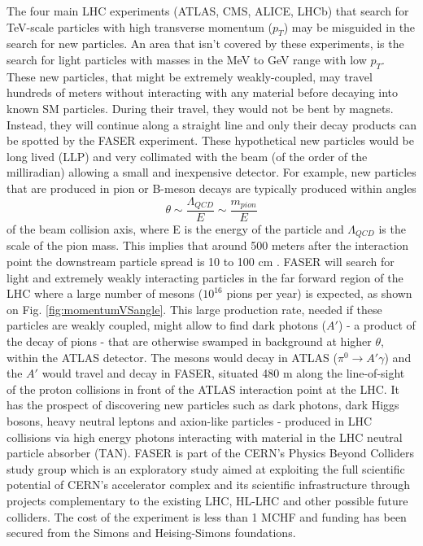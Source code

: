 The four main LHC experiments (ATLAS, CMS, ALICE, LHCb) that search for TeV-scale particles with high transverse momentum ($p_{T}$) may be misguided in the search for new particles. An area that isn't covered by these experiments, is the search for light particles with masses in the MeV to GeV range with low $p_{T}$. These new particles, that might be extremely weakly-coupled, may travel hundreds of meters without interacting with any material before decaying into known SM particles. During their travel, they would not be bent by magnets. Instead, they will continue along a straight line and only their decay products can be spotted by the FASER experiment. These hypothetical new particles would be long lived (LLP) and very collimated with the beam (of the order of the milliradian) allowing a small and inexpensive detector. For example, new particles that are produced in pion or B-meson decays are typically produced within angles \[ \theta\sim\frac{\Lambda_{QCD}}{E}\sim\frac{m_{pion}}{E} \] of the beam collision axis, where E is the energy of the particle and $\Lambda_{QCD}$ is the scale of the pion mass. This implies that around 500 meters after the interaction point the downstream particle spread is 10 to 100 cm \cite{faser_collaboration_letter_2018}. FASER will search for light and extremely weakly interacting particles in the far forward region of the LHC where a large number of mesons ($10^{16}$ pions per year) is expected, as shown on Fig. \ref{fig:momentumVSangle}. This large production rate, needed if these particles are weakly coupled, might allow to find dark photons ($A'$) - a product of the decay of pions - that are otherwise swamped in background at higher $\theta$, within the ATLAS detector. The mesons would decay in ATLAS ($\pi^{0}\rightarrow A'\gamma$) and the $A'$ would travel and decay in FASER, situated 480 m along the line-of-sight of the proton collisions in front of the ATLAS interaction point at the LHC. It has the prospect of discovering new particles such as dark photons, dark Higgs bosons, heavy neutral leptons and axion-like particles - produced in LHC collisions via high energy
photons interacting with material in the LHC neutral particle absorber
(TAN). FASER is part of the CERN's Physics Beyond Colliders study group which is an exploratory study aimed at exploiting the full scientific potential of CERN's accelerator complex and its scientific infrastructure through projects complementary to the existing LHC, HL-LHC and other possible future colliders. The cost of the
experiment is less than 1 MCHF and funding has been secured from the Simons and Heising-Simons foundations.

